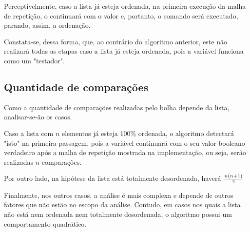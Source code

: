 Perceptivelmente, caso a lista já esteja ordenada, na primeira execução da malha de repetição, o  continuará com o valor  e, portanto, o comando  será executado, parando, assim, a ordenação.

Constata-se, dessa forma, que, ao contrário do algoritmo anterior, este não realizará todas as etapas caso a lista já esteja ordenada, pois a variável  funciona como um "testador".

\subsection*{Quantidade de comparações}
Como a quantidade de comparações realizadas pelo bolha depende da lista, analisar-se-ão os casos. 

Caso a lista com $n$ elementos já esteja 100\% ordenada, o algoritmo detectará "isto" na primeira passagem, pois a variável  continuará com o seu valor booleano verdadeiro após a malha de repetição mostrada na implementação, ou seja, serão realizadas $n$ comparações.

Por outro lado, na hipótese da lista está totalmente desordenada, haverá $n(n+1)\over 2$

Finalmente, nos outros casos, a análise é mais complexa e depende de outros fatores que não estão no escopo da análise. Contudo, em casos nos quais a lista não está nem ordenada nem totalmente desordenada, o algoritmo possui um comportamento quadrático.
